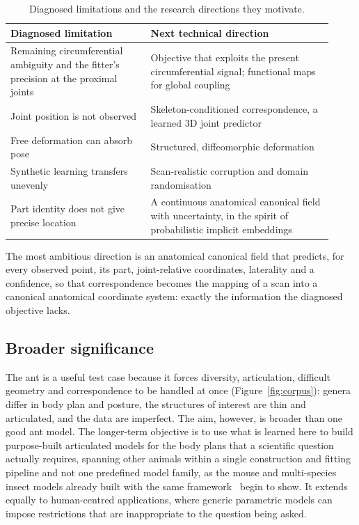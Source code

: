 \begin{table}[!htb]
\centering
\caption{Diagnosed limitations and the research directions they motivate.}
\label{tab:roadmap}
\begin{tabular}{@{}L{0.40\linewidth}L{0.52\linewidth}@{}}
\toprule
\textbf{Diagnosed limitation} & \textbf{Next technical direction}\\
\midrule
Remaining circumferential ambiguity and the fitter's precision at the proximal joints & Objective
 that exploits the present circumferential signal; functional maps~\cite{fmaps} for global coupling\\
Joint position is not observed & Skeleton-conditioned correspondence, a learned 3D
 joint predictor\\
Free deformation can absorb pose & Structured, diffeomorphic deformation\\
Synthetic learning transfers unevenly & Scan-realistic corruption and domain
 randomisation\\
Part identity does not give precise location & A continuous anatomical canonical
 field with uncertainty, in the spirit of probabilistic implicit
 embeddings~\cite{liu2020}\\
\bottomrule
\end{tabular}
\end{table}

The most ambitious direction is an anatomical canonical field that predicts, for
every observed point, its part, joint-relative coordinates, laterality and a
confidence, so that correspondence becomes the mapping of a scan into a canonical
anatomical coordinate system: exactly the information the diagnosed objective lacks.

\subsection{Broader significance}
\label{sec:significance}

The ant is a useful test case because it forces diversity, articulation, difficult geometry
and correspondence to be handled at once (Figure~\ref{fig:corpus}): genera differ in body
plan and posture, the structures of interest are thin and articulated, and the data are
imperfect. The aim, however, is broader than one good ant model. The longer-term objective
is to use what is learned here to build purpose-built articulated models for the body plans
that a scientific question actually requires, spanning other animals within a single
construction and fitting pipeline and not one predefined model family, as the mouse and
multi-species insect models already built with the same framework~\cite{smilify} begin to
show. It extends equally to human-centred applications, where generic parametric models can
impose restrictions that are inappropriate to the question being asked.

